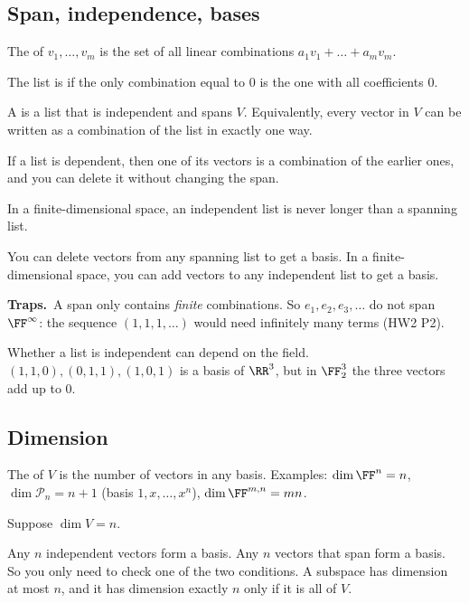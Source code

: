 \documentclass[11pt]{scrartcl}
\newcommand{\PP}{\mathcal P}
\newcommand{\traps}{\par\medskip\noindent\textbf{\color{RawSienna}Traps.}\ }
\begin{document}
\subsection{Span, independence, bases}
\begin{definition*}
  The  of $v_1,\dots,v_m$ is the set of all linear combinations $a_1v_1+\dots+a_mv_m$.

  The list is  if the only combination equal to $0$ is the one with all coefficients $0$.

  A  is a list that is independent and spans $V$. Equivalently, every vector in $V$ can be written as a combination of the list in exactly one way.
\end{definition*}

\begin{proposition*}
  If a list is dependent, then one of its vectors is a combination of the earlier ones, and you can delete it without changing the span.
\end{proposition*}

\begin{theorem*}[LADR 2.22]
  In a finite-dimensional space, an independent list is never longer than a spanning list.
\end{theorem*}

\begin{proposition*}[LADR 2.30, 2.32]
  You can delete vectors from any spanning list to get a basis.
  In a finite-dimensional space, you can add vectors to any independent list to get a basis.
\end{proposition*}

\traps A span only contains \emph{finite} combinations. So $e_1,e_2,e_3,\dots$ do not span $\FF^\infty$: the sequence $(1,1,1,\dots)$ would need infinitely many terms (HW2 P2).

Whether a list is independent can depend on the field. $(1,1,0),(0,1,1),(1,0,1)$ is a basis of $\RR^3$, but in $\FF_2^3$ the three vectors add up to $0$.

\subsection{Dimension}
The  of $V$ is the number of vectors in any basis.
Examples: $\dim\FF^n=n$, $\dim\PP_n=n+1$ (basis $1,x,\dots,x^n$), $\dim\FF^{m,n}=mn$.

\begin{proposition*}[LADR 2.38, 2.39, 2.42]
  Suppose $\dim V=n$.
  \begin{itemize}
    \ii Any $n$ independent vectors form a basis. Any $n$ vectors that span form a basis. So you only need to check one of the two conditions.
    \ii A subspace has dimension at most $n$, and it has dimension exactly $n$ only if it is all of $V$.
  \end{itemize}
\end{proposition*}
\end{document}
